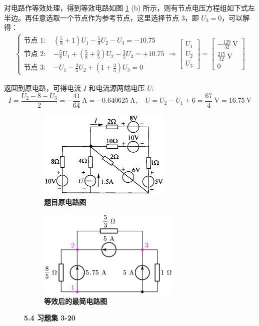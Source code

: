 \documentclass[UTF8]{report}
\theoremstyle{MyLineTheoremStyle} %
\theoremstyle{MyBlockTheoremStyle} %
\theoremstyle{MySubsubsectionStyle} %
\begin{document}
对电路作等效处理，得到等效电路如图 \ref{5.4 习题集 3-20} (b) 所示，则有节点电压方程组如下式左半边。再任意选取一个节点作为参考节点，这里选择节点 3，即 $U_3 = 0$，可以解得：
\begin{align}
\begin{cases}
    \text{节点 1: } &  \left(\frac{5}{8} + 1\right)U_1 -  \frac{5}{8} U_2 -  U_3 = - 10.75
    \\
    \text{节点 2: } & - \frac{5}{8} U_1 + \left( \frac{5}{8} + \frac{3}{5}\right)U_2 - \frac{3}{5} U_3 = +10.75 
    \\
    \text{节点 3: } & - U_1 - \frac{3}{5} U_2 + \left(1 + \frac{3}{5}\right)U_3 = 0
\end{cases}
\Longrightarrow 
\begin{bmatrix}
    U_1 \\ 
    U_2 \\
    U_3
\end{bmatrix} 
= 
\begin{bmatrix}
    -\frac{129}{32} \ \mathrm{V}\\
    \frac{215}{32} \ \mathrm{V}\\
    0
\end{bmatrix}
\end{align}

返回到原电路，可得电流 $I$ 和电流源两端电压 $U$: 
\begin{equation}
I = \frac{U_2 - 8 - U_3}{2} = -\frac{41}{64} \ \mathrm{A} = -0.640625 \ \mathrm{A},\quad U = U_2 - U_1 + 6 = \frac{67}{4} \ \mathrm{V} = 16.75 \ \mathrm{V}
\end{equation}

\begin{figure}[H]\centering
\begin{subfigure}[t]{0.5\columnwidth}\centering
    \includegraphics[height=120pt]{assets/5/5.4 (1).png}
    \caption{\bfseries 题目原电路图 }
\end{subfigure}\hfill
\begin{subfigure}[t]{0.5\columnwidth}\centering
    \includegraphics[height=120pt]{assets/5/5.4 (2).png}
    \caption{\bfseries 等效后的最简电路图 }
\end{subfigure}
\caption{\bfseries 5.4 习题集 3-20 }\label{5.4 习题集 3-20}
\end{figure}
\end{document}
